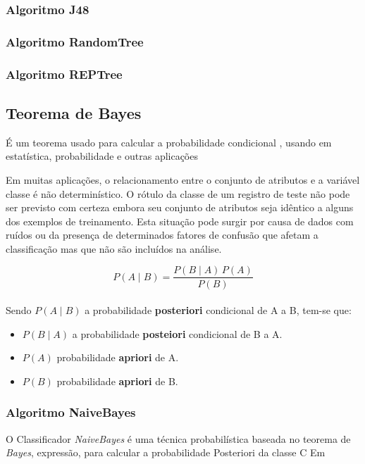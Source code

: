 \documentclass[
	12pt,				%
	openright,			%
	oneside,	
	a4paper,				%
	english,				%
	brazil				%
]{abntex2/abntex2} %
\begin{document}
	\subsubsection{Algoritmo J48}
	
	\subsubsection{Algoritmo RandomTree}
	
	\subsubsection{Algoritmo REPTree}
			
	\subsection{Teorema de Bayes}
	
	É um teorema usado para calcular a probabilidade condicional , usando em estatística, probabilidade e outras aplicações
	
	Em muitas aplicações, o relacionamento entre o conjunto de atributos e a variável classe é não determinístico. O rótulo da classe de um registro de teste não pode ser previsto com certeza embora seu conjunto de atributos seja idêntico a alguns dos exemplos de treinamento. Esta situação pode surgir por causa de dados com ruídos ou da presença de determinados fatores de confusão que afetam a classificação mas que não são incluídos na análise.
	
	\begin{equation}
		 P(A \mid B) = \frac{P(B \mid A) \, P(A)}{P(B)} 
	\end{equation}
	\\
	Sendo $ P(A\mid B) $ a probabilidade \textbf{posteriori} condicional de A a B, tem-se que:
	\begin{itemize}
		\item $P(B \mid A) $ a probabilidade \textbf{posteiori} condicional de B a A.
		\item $P(A) $ probabilidade \textbf{apriori} de A.
		\item $P(B )$ probabilidade \textbf{apriori} de B.
	\end{itemize}
	\subsubsection{Algoritmo NaiveBayes}
	O Classificador \textit{NaiveBayes} é uma técnica probabilística baseada no teorema de \textit{Bayes}, expressão, para calcular a probabilidade Posteriori da classe C
	Em \cite{john:1995}
	
\end{document}

